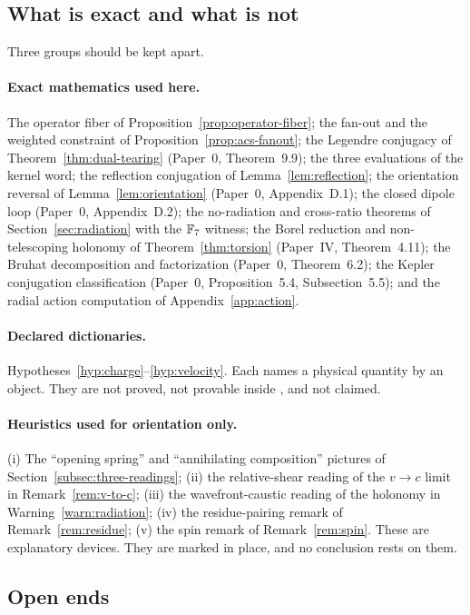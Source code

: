\subsection{What is exact and what is not}

Three groups should be kept apart.

\paragraph{Exact \AEG{} mathematics used here.}
The operator fiber of Proposition~\ref{prop:operator-fiber}; the fan-out and the
weighted constraint of Proposition~\ref{prop:acs-fanout}; the Legendre
conjugacy of Theorem~\ref{thm:dual-tearing} (Paper~0, Theorem~9.9); the three
evaluations of the kernel word; the reflection conjugation of
Lemma~\ref{lem:reflection}; the orientation reversal of
Lemma~\ref{lem:orientation} (Paper~0, Appendix~D.1); the closed dipole loop
(Paper~0, Appendix~D.2); the no-radiation and cross-ratio theorems of
Section~\ref{sec:radiation} with the $\mathbb{F}_7$ witness; the Borel reduction and
non-telescoping holonomy of Theorem~\ref{thm:torsion} (Paper~IV,
Theorem~4.11); the Bruhat decomposition and factorization
(Paper~0, Theorem~6.2); the Kepler conjugation classification
(Paper~0, Proposition~5.4, Subsection~5.5); and the radial action
computation of Appendix~\ref{app:action}.

\paragraph{Declared dictionaries.}
Hypotheses~\ref{hyp:charge}--\ref{hyp:velocity}.  Each names a physical
quantity by an \AEG{} object.  They are not proved, not provable inside \AEG{},
and not claimed.

\paragraph{Heuristics used for orientation only.}
(i) The ``opening spring'' and ``annihilating composition'' pictures of
Section~\ref{subsec:three-readings}; (ii) the relative-shear reading of the
$v\to c$ limit in Remark~\ref{rem:v-to-c}; (iii) the wavefront-caustic reading of
the holonomy in Warning~\ref{warn:radiation}; (iv) the residue-pairing remark of
Remark~\ref{rem:residue}; (v) the spin remark of Remark~\ref{rem:spin}.  These
are explanatory devices.  They are marked in place, and no conclusion rests on
them.

\subsection{Open ends}

